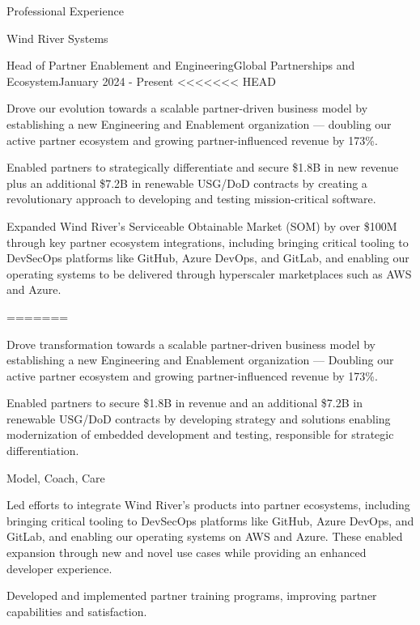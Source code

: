 \documentclass{resume} %
\begin{document}

\begin{rSection}{Professional Experience}
  
  \begin{rCompany}{Wind River Systems}{}{}

    \begin{rSubSubsection}{Head of Partner Enablement and Engineering}{Global Partnerships and Ecosystem}{January 2024 - Present}
<<<<<<< HEAD
      \item Drove our evolution towards a scalable partner-driven business model by establishing a new Engineering and Enablement organization --- doubling our active partner ecosystem and growing partner-influenced revenue by 173\%.
      \item Enabled partners to strategically differentiate and secure \$1.8B in new revenue plus an additional \$7.2B in renewable USG/DoD contracts by creating a revolutionary approach to developing and testing mission-critical software.
      \item Expanded Wind River's Serviceable Obtainable Market (SOM) by over \$100M through key partner ecosystem integrations, including bringing critical tooling to DevSecOps platforms like GitHub, Azure DevOps, and GitLab, and enabling our operating systems to be delivered through hyperscaler marketplaces such as AWS and Azure.
      \item 
=======
      \item Drove transformation towards a scalable partner-driven business model by establishing a new Engineering and Enablement organization --- Doubling our active partner ecosystem and growing partner-influenced revenue by 173\%.
      \item Enabled partners to secure \$1.8B in revenue and an additional \$7.2B in renewable USG/DoD contracts by developing strategy and solutions enabling modernization of embedded development and testing, responsible for strategic differentiation.
      \item Model, Coach, Care
      \item Led efforts to integrate Wind River's products into partner ecosystems, including bringing critical tooling to DevSecOps platforms like GitHub, Azure DevOps, and GitLab, and enabling our operating systems on AWS and Azure. These enabled expansion through new and novel use cases while providing an enhanced developer experience.
      \item Developed and implemented partner training programs, improving partner capabilities and satisfaction.
      

\end{rSubSubsection}
\end{rCompany}
\end{rSection}
\end{document}
